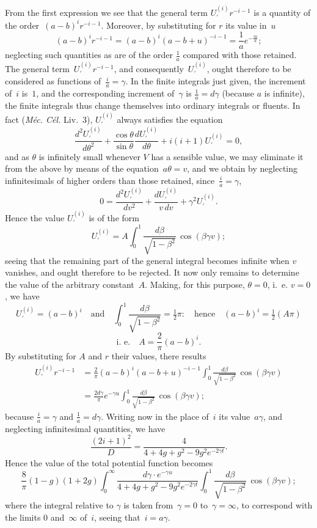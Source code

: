 \documentclass[12pt,notitlepage]{amsart}
\let\Title\textit
\begin{document}
From the first expression we see that the
general term $U_\prime^{(i)}r^{-i-1}$ is
a quantity of the order~$(a-b)^ir^{-i-1}$.
Moreover, by substituting for $r$ its
value in~$u$
\[
(a-b)^ir^{-i-1}=(a-b)^i(a-b+u)^{-i-1}=\frac1ae^{-\frac{iu}{a}};
\]
neglecting such quantities as are
of the order $\frac1a$ compared with those retained.
The general term~$U_\prime^{(i)}r^{-i-1}$, and consequently~$U_\prime^{(i)}$,
ought therefore to be
considered as functions of~${\frac ia=\gamma}$.
In the finite integrals just given, the
increment of~$i$ is~$1$, and the corresponding increment
of~$\gamma$ is $\frac1a=d\gamma$ (because
$a$ is infinite), the finite integrals thus
change themselves into ordinary integrals
or fluents. In fact (\Title{M\'ec. C\'el.} Liv.~3),
$U_\prime^{(i)}$ always satisfies the equation
\[
\frac{d^2U_\prime^{(i)}}{d\theta^2}
+\frac{\cos\theta}{\sin\theta}\frac{dU_\prime^{(i)}}{d\theta}
+i(i+1)U_\prime^{(i)}=0,
\]
and as $\theta$ is infinitely small whenever $V$
has a sensible value, we may eliminate
it from the above by means of the equation~${a\theta=v}$,
and we obtain by
neglecting infinitesimals of higher orders than those retained,
since~${\frac ia=\gamma}$,
\[
0=\frac{d^2U_\prime^{(i)}}{dv^2}
+\frac{dU_\prime^{(i)}}{v\,dv}
+\gamma^2U_\prime^{(i)}.
\]
Hence the value $U_\prime^{(i)}$ is of the form
\[
U_\prime^{(i)}=
A\int_0^1\frac{d\beta}{\sqrt{1-\beta^2}}\,\cos(\beta\gamma v);
\]
seeing that the remaining part of the general integral becomes infinite when $v$
vanishes, and ought therefore to be rejected. It now only remains to determine
the value of the arbitrary constant~$A$. Making, for this purpose, $\theta=0$,
i.~e. $v=0$, we have
\[
U_\prime^{(i)}=(a-b)^i
\quad\text{and}\quad
\int_0^1\frac{d\beta}{\sqrt{1-\beta^2}}=\tfrac12\pi:
\quad\text{hence}\quad
(a-b)^i=\tfrac12(A\pi)
\]
\[
\text{i.~e.}\quad
A=\frac2\pi(a-b)^i.
\]
By substituting for $A$ and $r$ their values, there results
\[
\begin{aligned}
U_\prime^{(i)}r^{-i-1} &=
\frac2\pi(a-b)^i(a-b+u)^{-i-1}
\int_0^1\frac{d\beta}{\sqrt{1-\beta^2}}\,\cos(\beta\gamma v)\\
&=\frac{2d\gamma}{\pi}e^{-\gamma u}
\int_0^1\frac{d\beta}{\sqrt{1-\beta^2}}\,\cos(\beta\gamma v);
\end{aligned}
\]
because $\frac ia=\gamma$ and $\frac1a=d\gamma$.
Writing now in the place of~$i$ its value~$a\gamma$,
and neglecting infinitesimal quantities, we have
\[
\frac{(2i+1)^2}{D}=\frac{4}{4+4g+g^2-9g^2e^{-2\gamma t}}.
\]
Hence the value of the total potential function becomes
\[
\frac8\pi(1-g)(1+2g)
\int_0^\infty\frac{d\gamma\cdot e^{-\gamma u}}{4+4g+g^2-9g^2e^{-2\gamma t}}
\int_0^1\frac{d\beta}{\sqrt{1-\beta^2}}\,\cos(\beta\gamma v);
\]
where the integral relative to $\gamma$ is taken
from~$\gamma=0$ to~$\gamma=\infty$, to correspond
with the limits $0$ and~$\infty$ of~$i$, seeing that~${i=a\gamma}$.
\end{document}
